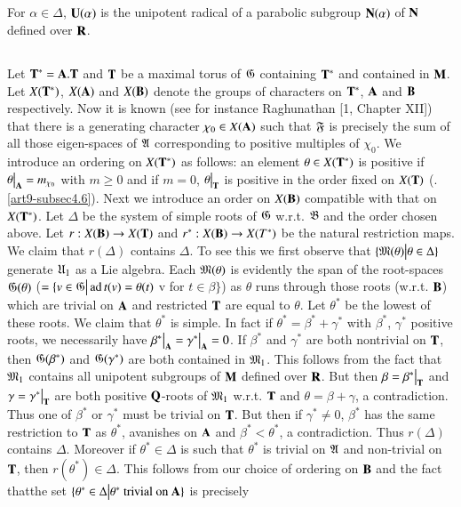 \subsection{}\label{art9-subsec4.10}
For $\alpha \in \Delta$, $\mathbf{U} (\alpha)$  is the unipotent radical of a parabolic subgroup $\mathbf{N} (\alpha)$ of $\mathbf{N}$ defined over $\mathbf{R}$. 

\subsection{}\label{art9-subsec4.11}
Let $\mathbf{T}^\ast = \mathbf{A}. \mathbf{T}$ and $\mathbf{T}$ be a maximal torus of $\mathfrak{G}$ containing $\mathbf{T}^\ast$ and contained in $\mathbf{M}$. Let $X (\mathbf{T}^\ast)$, $X(\mathbf{A})$ and $X (\mathbf{B})$ denote the groups of characters on $\mathbf{T}^\ast$, $\mathbf{A}$ and $\mathbf{B}$ respectively. Now it is known (see for instance Raghunathan [1, Chapter XII]) that there is a generating character $\chi_0 \in X (\mathbf{A})$ such that $\mathfrak{F}$ is precisely the sum of all those eigen-spaces of $\mathfrak{A}$ corresponding to positive multiples of $\chi_0$. We introduce an ordering on $X (\mathbf{T}^\ast)$ as follows: an element $\theta \in X(\mathbf{T}^\ast)$ is positive if $\theta \big|_{\mathbf{A}} = m_{\chi_0}$ with $m \geqslant 0$ and if $m = 0$, $\theta\big|_{\mathbf{T}}$ is positive in the order fixed on $X (\mathbf{T})$ (\cf. \ref{art9-subsec4.6}). Next we introduce an order on $X (\mathbf{B})$ compatible with that on $X(\mathbf{T}^\ast)$. Let $\Delta$ be the system of simple roots of $\mathfrak{G}$ w.r.t. $\mathfrak{B}$ and the order chosen above. Let $r : X (\mathbf{B}) \to X (\mathbf{T})$ and $r^\ast: X (\mathbf{B}) \to X (T^\ast)$ be the natural restriction maps. We claim that $r (\Delta)$ contains $\Delta$. To see this we first observe that $\{\mathfrak{M} (\theta) \big| \theta \in \Delta\}$ generate $\mathfrak{U}_1$ as a Lie algebra. Each $\mathfrak{M} (\theta)$ is evidently the span of the root-spaces $\mathfrak{G} (\theta)$ ($= \{v \in \mathfrak{G} \big| \operatorname{ad} t (v) = \theta (t)$ v for $t \in \beta\}$) as $\theta$ runs through those roots (w.r.t. $\mathbf{B}$) which are trivial on $\mathbf{A}$ and restricted $\mathbf{T}$ are equal to $\theta$. Let $\theta^\ast$ be the lowest of these roots. We claim that $\theta^\ast$ is simple. In fact if $\theta^\ast =\beta^\ast + \gamma^\ast$ with $\beta^\ast$, $\gamma^\ast$ positive roots, we necessarily have $\beta^\ast \big|_{\mathbf{A}} = \gamma^\ast \big|_{\mathbf{A}} =0$. If $\beta^\ast$ and $\gamma^\ast$ are both nontrivial on $\mathbf{T}$, then $\mathfrak{G}(\beta^\ast)$ and $\mathfrak{G} (\gamma^\ast)$ are both contained in $\mathfrak{M}_1$. This follows from the fact that $\mathfrak{M}_1$ contains all unipotent subgroups of $\mathbf{M}$ defined over $\mathbf{R}$. But then $\beta = \beta^\ast \big|_{\mathbf{T}}$ and $\gamma= \gamma^\ast\big|_{\mathbf{T}}$ are both positive $\mathbf{Q}$-roots of $\mathfrak{M}_1$ w.r.t. $\mathbf{T}$ and $\theta= \beta + \gamma$, a contradiction. Thus one of $\beta^\ast$ or $\gamma^\ast$ must be trivial on $\mathbf{T}$. But then if $\gamma^\ast \neq 0$, $\beta^\ast$ has the same restriction to $\mathbf{T}$ as $\theta^\ast$, avanishes on $\mathbf{A}$ and $\beta^\ast < \theta^\ast$, a contradiction. Thus $r (\Delta)$ contains $\Delta$. Moreover if $\theta^\ast \in \Delta$ is such that $\theta^\ast$ is trivial on $\mathfrak{A}$ and non-trivial on $\mathbf{T}$, then $r (\theta^\ast) \in \Delta$. This follows from our choice of ordering on $\mathbf{B}$ and the fact that\pageoriginale the set $\{\theta^\ast \in \Delta \big| \theta^\ast \text{ trivial on } \mathbf{A}\}$  is precisely 